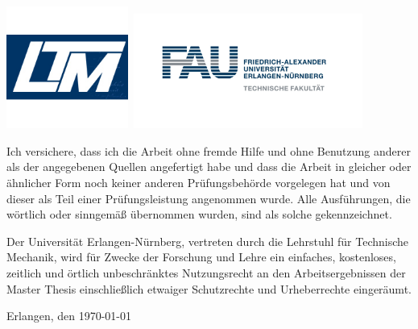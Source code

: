 \documentclass[a4paper,12pt,BCOR0mm,headsepline,final,oneside]{scrbook}
\newcommand{\thethesis}[0]{%
  Master Thesis
}
\begin{document}
\begin{titlepage}
\begin{center}
  \end{center}
  \includegraphics[width=4cm]{ltm.png}\hspace*{4cm}~\includegraphics[width=7.5cm]{logo_fau.jpg}
\end{titlepage}

\clearpage{\pagestyle{empty}\cleardoublepage}

\thispagestyle{empty}
Ich versichere, dass ich die Arbeit ohne fremde Hilfe und ohne Benutzung
anderer als der angegebenen Quellen angefertigt habe und dass die Arbeit in
gleicher oder \"ahnlicher Form noch keiner anderen Pr\"ufungsbeh\"orde
vorgelegen hat und von dieser als Teil einer Pr\"ufungsleistung angenommen
wurde. Alle Ausf\"uhrungen, die w\"ortlich oder sinngem\"a\ss{} \"ubernommen
wurden, sind als solche gekennzeichnet.

\vspace{2cm}

Der Universit\"at Erlangen-N\"urnberg, vertreten durch die Lehrstuhl f\"ur Technische Mechanik, wird f\"ur Zwecke der Forschung und Lehre ein einfaches,
kostenloses, zeitlich und \"ortlich unbeschr\"anktes Nutzungsrecht an den
Arbeitsergebnissen der \thethesis einschlie\ss{}lich etwaiger Schutzrechte und
Urheberrechte einger\"aumt.

\vspace{2cm}
Erlangen, den \today

\vspace{2cm}
 \hfill \ 

\vspace{0,5cm}

\clearpage{\pagestyle{empty}\cleardoublepage}
\end{document}
